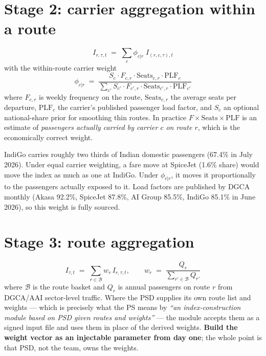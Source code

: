 \section{Stage 2: carrier aggregation within a route}
\label{sec:carrierweights}

\begin{equation}
I_{r,\tau,t} \;=\; \sum_{c} \phi_{c|r}\; I_{(r,c,\tau),t}
\end{equation}
with the within-route carrier weight
\begin{equation}
\phi_{c|r} \;=\; \frac{S_{c}\cdot F_{c,r}\cdot \text{Seats}_{c,r}\cdot \text{PLF}_{c}}
{\sum_{c'} S_{c'}\cdot F_{c',r}\cdot \text{Seats}_{c',r}\cdot \text{PLF}_{c'}}
\end{equation}
where $F_{c,r}$ is weekly frequency on the route, $\text{Seats}_{c,r}$ the average seats per
departure, $\text{PLF}_c$ the carrier's published passenger load factor, and $S_c$ an
optional national-share prior for smoothing thin routes. In practice
$F\times\text{Seats}\times\text{PLF}$ is an estimate of \emph{passengers actually carried by
carrier $c$ on route $r$}, which is the economically correct weight.

\begin{keybox}
 IndiGo carries roughly two thirds of Indian domestic
passengers (67.4\% in July 2026). Under equal carrier weighting, a fare move at SpiceJet
(1.6\% share) would move the index as much as one at IndiGo. Under $\phi_{c|r}$, it moves it
proportionally to the passengers actually exposed to it. Load factors are published by DGCA
monthly (Akasa 92.2\%, SpiceJet 87.8\%, AI Group 85.5\%, IndiGo 85.1\% in June 2026), so
this weight is fully sourced.
\end{keybox}

\section{Stage 3: route aggregation}

\begin{equation}
I_{\tau,t} \;=\; \sum_{r\in\mathcal{B}} w_r\, I_{r,\tau,t},
\qquad
w_r \;=\; \frac{Q_r}{\sum_{r'\in\mathcal{B}} Q_{r'}}
\end{equation}
where $\mathcal{B}$ is the route basket and $Q_r$ is annual passengers on route $r$ from
DGCA/AAI sector-level traffic. Where the PSD supplies its own route list and weights ---
which is precisely what the PS means by \emph{``an index-construction module based on PSD
given routes and weights''} --- the module accepts them as a signed input file and uses
them in place of the derived weights. \textbf{Build the weight vector as an injectable
parameter from day one}; the whole point is that PSD, not the team, owns the weights.

